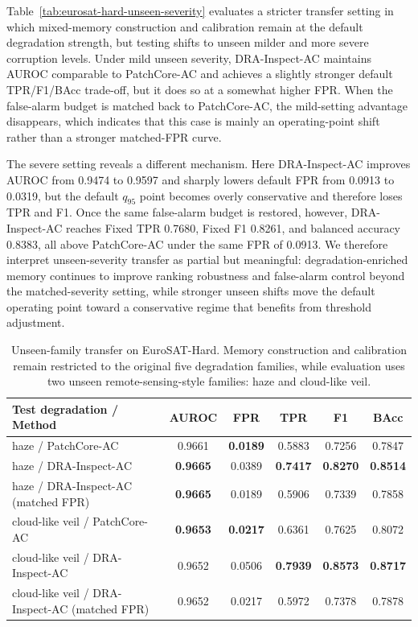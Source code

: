 \documentclass[remotesensing,article,submit,pdftex,moreauthors]{Definitions/mdpi}
\begin{document}
\noindent Table~\ref{tab:eurosat-hard-unseen-severity} evaluates a stricter transfer setting in which mixed-memory construction and calibration remain at the default degradation strength, but testing shifts to unseen milder and more severe corruption levels. Under mild unseen severity, DRA-Inspect-AC maintains AUROC comparable to PatchCore-AC and achieves a slightly stronger default TPR/F1/BAcc trade-off, but it does so at a somewhat higher FPR. When the false-alarm budget is matched back to PatchCore-AC, the mild-setting advantage disappears, which indicates that this case is mainly an operating-point shift rather than a stronger matched-FPR curve.

\noindent The severe setting reveals a different mechanism. Here DRA-Inspect-AC improves AUROC from 0.9474 to 0.9597 and sharply lowers default FPR from 0.0913 to 0.0319, but the default $q_{95}$ point becomes overly conservative and therefore loses TPR and F1. Once the same false-alarm budget is restored, however, DRA-Inspect-AC reaches Fixed TPR 0.7680, Fixed F1 0.8261, and balanced accuracy 0.8383, all above PatchCore-AC under the same FPR of 0.0913. We therefore interpret unseen-severity transfer as partial but meaningful: degradation-enriched memory continues to improve ranking robustness and false-alarm control beyond the matched-severity setting, while stronger unseen shifts move the default operating point toward a conservative regime that benefits from threshold adjustment.

\begin{table}[!htbp]
\caption{Unseen-family transfer on EuroSAT-Hard. Memory construction and calibration remain restricted to the original five degradation families, while evaluation uses two unseen remote-sensing-style families: haze and cloud-like veil.}
\label{tab:eurosat-hard-unseen-family}
\centering
\small
\setlength{\tabcolsep}{4pt}
\begin{tabular}{lccccc}
\hline
Test degradation / Method & AUROC & FPR & TPR & F1 & BAcc \\
\hline
haze / PatchCore-AC & 0.9661 & \textbf{0.0189} & 0.5883 & 0.7256 & 0.7847 \\
haze / DRA-Inspect-AC & \textbf{0.9665} & 0.0389 & \textbf{0.7417} & \textbf{0.8270} & \textbf{0.8514} \\
haze / DRA-Inspect-AC (matched FPR) & \textbf{0.9665} & 0.0189 & 0.5906 & 0.7339 & 0.7858 \\
cloud-like veil / PatchCore-AC & \textbf{0.9653} & \textbf{0.0217} & 0.6361 & 0.7625 & 0.8072 \\
cloud-like veil / DRA-Inspect-AC & 0.9652 & 0.0506 & \textbf{0.7939} & \textbf{0.8573} & \textbf{0.8717} \\
cloud-like veil / DRA-Inspect-AC (matched FPR) & 0.9652 & 0.0217 & 0.5972 & 0.7378 & 0.7878 \\
\hline
\end{tabular}
\end{table}
\end{document}
